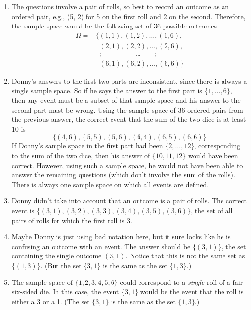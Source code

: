\documentclass[
]{book}
\providecommand{\tightlist}{%
  \setlength{\itemsep}{0pt}\setlength{\parskip}{0pt}}
\theoremstyle{definition}
\theoremstyle{definition}
\theoremstyle{definition}
\theoremstyle{remark}
\begin{document}
\begin{enumerate}
\def\labelenumi{\arabic{enumi}.}
\tightlist
\item
  The questions involve a pair of rolls, so best to record an outcome as an ordered pair, e.g., (5, 2) for 5 on the first roll and 2 on the second. Therefore, the sample space would be the following set of 36 possible outcomes.
  \begin{align*}
  \Omega  = & \{
  (1, 1), (1, 2), \ldots, (1, 6),\\
  & \;\; (2, 1), (2, 2), \ldots, (2, 6),\\
  & \;\; \vdots\qquad \qquad \quad \cdots \qquad \vdots\\
  & \;\; (6, 1), (6, 2), \ldots, (6, 6)
  \}
  \end{align*}
\item
  Donny's answers to the first two parts are inconsistent, since there is always a single sample space. So if he says the answer to the first part is \(\{1, \ldots, 6\}\), then any event must be a subset of that sample space and his answer to the second part must be wrong. Using the sample space of 36 ordered pairs from the previous answer, the correct event that the sum of the two dice is at least 10 is
  \[
  \{(4, 6), (5, 5), (5, 6), (6, 4), (6, 5), (6, 6)\}
  \]
  If Donny's sample space in the first part had been \(\{2, \ldots, 12\}\), corresponding to the sum of the two dice, then his answer of \(\{10, 11, 12\}\) would have been correct. However, using such a sample space, he would not have been able to answer the remaining questions (which don't involve the sum of the rolls). There is always one sample space on which all events are defined.
\item
  Donny didn't take into account that an outcome is a pair of rolls. The correct event is \(\{(3, 1), (3, 2), (3, 3), (3, 4), (3, 5), (3, 6)\}\), the set of all pairs of rolls for which the first roll is 3.
\item
  Maybe Donny is just using bad notation here, but it sure looks like he is confusing an outcome with an event. The answer should be \(\{(3, 1)\}\), the set containing the single outcome \((3, 1)\). Notice that this is not the same set as \(\{(1, 3)\}\). (But the set \(\{3, 1\}\) is the same as the set \(\{1, 3\}\).)
\item
  The sample space of \(\{1, 2, 3, 4, 5, 6\}\) could correspond to a \emph{single} roll of a fair six-sided die. In this case, the event \(\{3, 1\}\) would be the event that the roll is either a 3 or a 1. (The set \(\{3, 1\}\) is the same as the set \(\{1, 3\}\).)
\end{enumerate}
\end{document}
